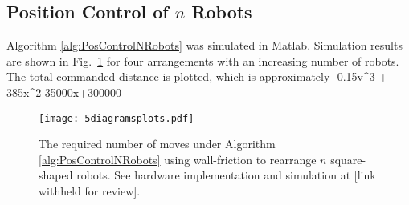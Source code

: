 

\subsection{Position Control of $n$ Robots}
Algorithm \ref{alg:PosControlNRobots}  was simulated in {\sc Matlab}.
Simulation results are shown in Fig.~\ref{fig:4diagramsplots.pdf} for four arrangements with an increasing number of robots.  
The total commanded distance is plotted, which is approximately -0.15v^3 + 385x^2-35000x+300000


\begin{figure}
\begin{center}
	\texttt{[image: 5diagramsplots.pdf]}
\end{center}
\caption{\label{fig:4diagramsplots.pdf}
The required number of moves under Algorithm \ref{alg:PosControlNRobots}  using wall-friction to rearrange $n$ square-shaped 
robots.  %
See hardware implementation and simulation at [link withheld for review].
}
\end{figure}

